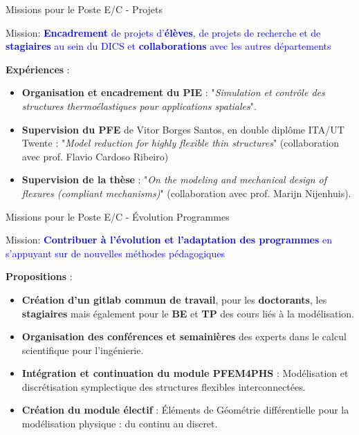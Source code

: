 \documentclass[aspectratio=169, french]{beamer}
\begin{document}
\begin{frame}{Missions pour le Poste E/C - Projets}
	
	\begin{tcolorbox}
		Mission: \textcolor{blue}{\textbf{Encadrement} de projets d’\textbf{élèves}, de projets de recherche et de
		\textbf{stagiaires} au sein du DICS et \textbf{collaborations} avec les autres départements}
	\end{tcolorbox}

\textbf{Expériences} :
	\begin{itemize}
		\item \textbf{Organisation et encadrement du PIE} : "\textit{Simulation et contrôle des structures thermoélastiques pour applications spatiales}".
		\item \textbf{Supervision du PFE} de Vitor Borges Santos, en double diplôme ITA/UT Twente : "\textit{Model reduction for highly flexible thin structures}" (collaboration avec prof. Flavio Cardoso Ribeiro)
		\item \textbf{Supervision de la thèse} : "\textit{On the modeling and mechanical design of flexures (compliant mechanisms)}" (collaboration avec prof. Marijn Nijenhuis).
	\end{itemize}

\end{frame}


\begin{frame}{Missions pour le Poste E/C - Évolution Programmes}
	\begin{tcolorbox}
		Mission: \textcolor{blue}{\textbf{Contribuer à l’évolution et l’adaptation des programmes} en
		s’appuyant sur de nouvelles méthodes pédagogiques}
	\end{tcolorbox}

\textbf{Propositions} :

	
	\begin{itemize}
		\item \textbf{Création d'un gitlab commun de travail}, pour les \textbf{doctorants}, les \textbf{stagiaires} mais également pour le \textbf{BE} et \textbf{TP} des cours liés à la modélisation.
		\item \textbf{Organisation des conférences et semainières} des experts dans le calcul scientifique pour l'ingénierie.
		\item \textbf{Intégration et continuation du module PFEM4PHS} : Modélisation et discrétisation symplectique des structures flexibles interconnectées.
		\item \textbf{Création du module électif} : Éléments de Géométrie différentielle pour la modélisation physique : du continu au discret.
	\end{itemize}
\end{frame}
\end{document}
